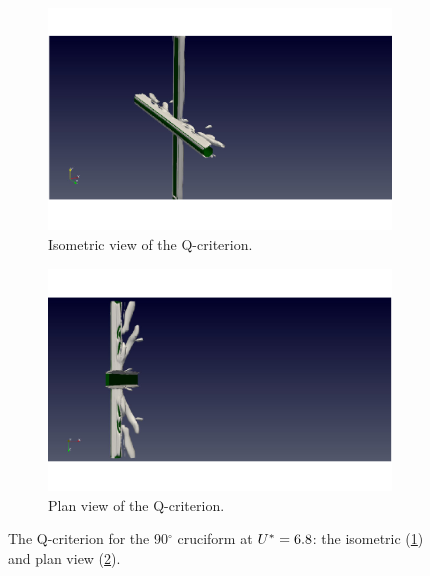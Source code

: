 \documentclass[oneside]{utmthesis}
\begin{document}
\begin{figure}
  \centering
  \begin{subfigure}[h]{0.9\textwidth}
    \includegraphics[width=\textwidth]{figs/qIso090U02}
    \caption{Isometric view of the Q-criterion.}
    \label{fig:qIso090U02}
  \end{subfigure}
  
  \begin{subfigure}[h]{0.9\textwidth}
    \includegraphics[width=\textwidth]{figs/qTop090U02}
    \caption{Plan view of the Q-criterion.}
    \label{fig:qTop090U02}
  \end{subfigure}

  \caption{The Q-criterion for the 90$^{\circ}$ cruciform at $U^{*} = 6.8$: the isometric (\ref{fig:qIso090U02}) and plan view (\ref{fig:qTop090U02}).} \label{fig:qCrit090U02}
\end{figure}
\end{document}
